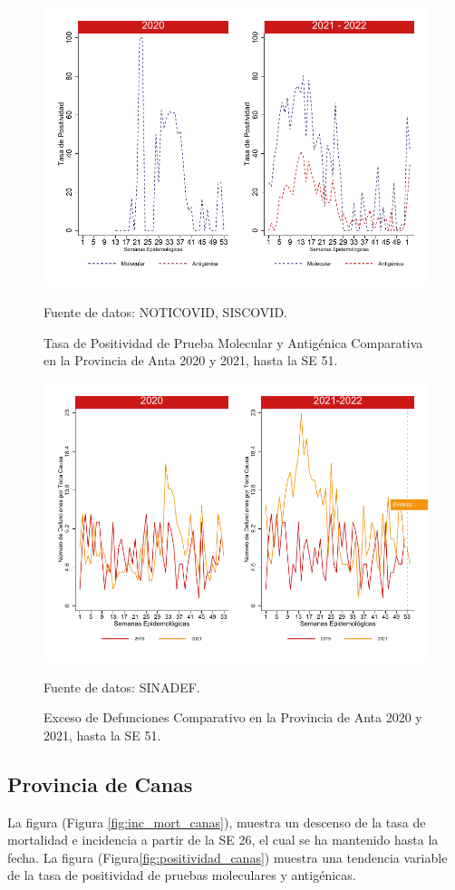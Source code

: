 \documentclass[12pt,a4paper,openany]{book}
\begin{document}
		\begin{figure}[h]
			\caption{Tasa de Positividad de Prueba Molecular y Antigénica Comparativa en la Provincia de Anta 2020 y 2021, hasta la SE 51.}\label{fig:positividad_anta}
			\begin{center}
				\includegraphics[width=0.7\linewidth]{../figuras/positividad_20_21_2}
			\end{center}
			{\footnotesize {Fuente de datos: NOTICOVID, SISCOVID.}}
		\end{figure}
		
		\begin{figure}[h]
			\caption{Exceso de Defunciones Comparativo en la Provincia de Anta  2020 y 2021, hasta la SE 51.}\label{fig:exceso_anta}
			\begin{center}
				\includegraphics[width=0.7\linewidth]{../figuras/exceso_2}
			\end{center}
			{\footnotesize {Fuente de datos: SINADEF.}}
		\end{figure}
		
		\clearpage
		
		\subsection*{Provincia de Canas}
		\noindent La figura (Figura \ref{fig:inc_mort_canas}),  muestra un descenso de la tasa de mortalidad e incidencia a partir de la SE 26, el cual se ha mantenido hasta la fecha. 
		\noindent La figura (Figura\ref{fig:positividad_canas}) muestra una tendencia variable de la tasa de positividad de pruebas moleculares y antigénicas.
		
\end{document}
